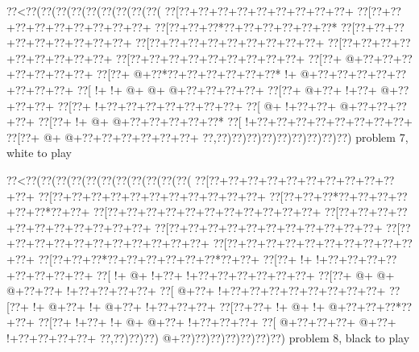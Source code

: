 \vbox{\vbox{\goo
\0??<\0??(\0??(\0??(\0??(\0??(\0??(\0??(\0??(\0??(
\0??[\0??+\0??+\0??+\0??+\0??+\0??+\0??+\0??+\0??+
\0??[\0??+\0??+\0??+\0??+\0??+\0??+\0??+\0??+\0??+
\0??[\0??+\0??+\0??*\0??+\0??+\0??+\0??+\0??+\0??*
\0??[\0??+\0??+\0??+\0??+\0??+\0??+\0??+\0??+\0??+
\0??[\0??+\0??+\0??+\0??+\0??+\0??+\0??+\0??+\0??+
\0??[\0??+\0??+\0??+\0??+\0??+\0??+\0??+\0??+\0??+
\0??[\0??+\0??+\0??+\0??+\0??+\0??+\0??+\0??+\0??+
\0??[\0??+\- @+\0??+\0??+\0??+\0??+\0??+\0??+\0??+
\0??[\0??+\- @+\0??*\0??+\0??+\0??+\0??+\0??+\0??*
\- !+\- @+\0??+\0??+\0??+\0??+\0??+\0??+\0??+\0??+
\0??[\- !+\- !+\- @+\- @+\- @+\0??+\0??+\0??+\0??+
\0??[\0??+\- @+\0??+\- !+\0??+\- @+\0??+\0??+\0??+
\0??[\0??+\- !+\0??+\0??+\0??+\0??+\0??+\0??+\0??+
\0??[\- @+\- !+\0??+\0??+\- @+\0??+\0??+\0??+\0??+
\0??[\0??+\- !+\- @+\- @+\0??+\0??+\0??+\0??+\0??*
\0??[\- !+\0??+\0??+\0??+\0??+\0??+\0??+\0??+\0??+
\0??[\0??+\- @+\- @+\0??+\0??+\0??+\0??+\0??+\0??+
\0??,\0??)\0??)\0??)\0??)\0??)\0??)\0??)\0??)\0??)
}
\hfil problem 7, white to play\hfil\break
}

\vbox{\vbox{\goo
\0??<\0??(\0??(\0??(\0??(\0??(\0??(\0??(\0??(\0??(\0??(\0??(
\0??[\0??+\0??+\0??+\0??+\0??+\0??+\0??+\0??+\0??+\0??+\0??+
\0??[\0??+\0??+\0??+\0??+\0??+\0??+\0??+\0??+\0??+\0??+\0??+
\0??[\0??+\0??+\0??*\0??+\0??+\0??+\0??+\0??+\0??*\0??+\0??+
\0??[\0??+\0??+\0??+\0??+\0??+\0??+\0??+\0??+\0??+\0??+\0??+
\0??[\0??+\0??+\0??+\0??+\0??+\0??+\0??+\0??+\0??+\0??+\0??+
\0??[\0??+\0??+\0??+\0??+\0??+\0??+\0??+\0??+\0??+\0??+\0??+
\0??[\0??+\0??+\0??+\0??+\0??+\0??+\0??+\0??+\0??+\0??+\0??+
\0??[\0??+\0??+\0??+\0??+\0??+\0??+\0??+\0??+\0??+\0??+\0??+
\0??[\0??+\0??+\0??*\0??+\0??+\0??+\0??+\0??+\0??*\0??+\0??+
\0??[\0??+\- !+\- !+\0??+\0??+\0??+\0??+\0??+\0??+\0??+\0??+
\0??[\- !+\- @+\- !+\0??+\- !+\0??+\0??+\0??+\0??+\0??+\0??+
\0??[\0??+\- @+\- @+\- @+\0??+\0??+\- !+\0??+\0??+\0??+\0??+
\0??[\- @+\0??+\- !+\0??+\0??+\0??+\0??+\0??+\0??+\0??+\0??+
\0??[\0??+\- !+\- @+\0??+\- !+\- @+\0??+\- !+\0??+\0??+\0??+
\0??[\0??+\0??+\- !+\- @+\- !+\- @+\0??+\0??+\0??*\0??+\0??+
\0??[\0??+\- !+\0??+\- !+\- @+\- @+\0??+\- !+\0??+\0??+\0??+
\0??[\- @+\0??+\0??+\0??+\- @+\0??+\- !+\0??+\0??+\0??+\0??+
\0??,\0??)\0??)\0??)\- @+\0??)\0??)\0??)\0??)\0??)\0??)\0??)
}
\hfil problem 8, black to play\hfil\break
}

